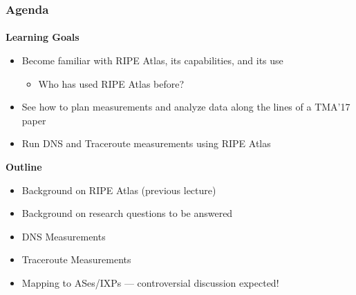 


\PraesentationMasterKopfzeileDreizeiler

\PraesentationTitelseite

\PraesentationMasterStandard


\usetikzlibrary{shapes,arrows,shadows}



\begin{frame}[fragile]
	\frametitle{Agenda}
	\framesubtitle{}

	\textbf{Learning Goals}
	\begin{itemize}
		\item Become familiar with RIPE Atlas, its capabilities, and its use
		\begin{itemize}
			\item Who has used RIPE Atlas before?
		\end{itemize}
		\item See how to plan measurements and analyze data along the lines of a TMA'17 paper
		\item Run DNS and Traceroute measurements using RIPE Atlas
	\end{itemize}	

	\textbf{Outline}
\begin{itemize}
	\item Background on RIPE Atlas (previous lecture)
	\item Background on research questions to be answered
	\item DNS Measurements
	\item Traceroute Measurements
	\item Mapping to ASes/IXPs --- controversial discussion expected! \smiley{}
\end{itemize}	



\end{frame}
\clearpage

